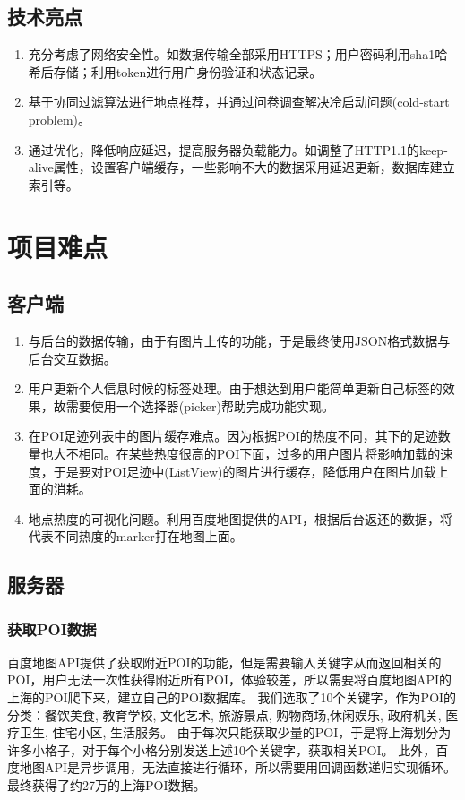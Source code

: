 \documentclass[UTF8]{article}
\begin{document}
\subsection{技术亮点}
\begin{enumerate}
    \item 充分考虑了网络安全性。如数据传输全部采用HTTPS；用户密码利用sha1哈希后存储；利用token进行用户身份验证和状态记录。
    \item 基于协同过滤算法进行地点推荐，并通过问卷调查解决冷启动问题(cold-start problem)。
    \item 通过优化，降低响应延迟，提高服务器负载能力。如调整了HTTP1.1的keep-alive属性，设置客户端缓存，一些影响不大的数据采用延迟更新，数据库建立索引等。
\end{enumerate}

\section{项目难点}
\subsection{客户端}
\begin{enumerate}
    \item 与后台的数据传输，由于有图片上传的功能，于是最终使用JSON格式数据与后台交互数据。
    \item 用户更新个人信息时候的标签处理。由于想达到用户能简单更新自己标签的效果，故需要使用一个选择器(picker)帮助完成功能实现。
    \item 在POI足迹列表中的图片缓存难点。因为根据POI的热度不同，其下的足迹数量也大不相同。在某些热度很高的POI下面，过多的用户图片将影响加载的速度，于是要对POI足迹中(ListView)的图片进行缓存，降低用户在图片加载上面的消耗。
    \item 地点热度的可视化问题。利用百度地图提供的API，根据后台返还的数据，将代表不同热度的marker打在地图上面。
\end{enumerate}

\subsection{服务器}
\subsubsection{获取POI数据}
百度地图API提供了获取附近POI的功能，但是需要输入关键字从而返回相关的POI，用户无法一次性获得附近所有POI，体验较差，所以需要将百度地图API的上海的POI爬下来，建立自己的POI数据库。
我们选取了10个关键字，作为POI的分类：餐饮美食, 教育学校, 文化艺术, 旅游景点, 购物商场,休闲娱乐, 政府机关, 医疗卫生, 住宅小区, 生活服务。
由于每次只能获取少量的POI，于是将上海划分为许多小格子，对于每个小格分别发送上述10个关键字，获取相关POI。
此外，百度地图API是异步调用，无法直接进行循环，所以需要用回调函数递归实现循环。
最终获得了约27万的上海POI数据。
\end{document}
